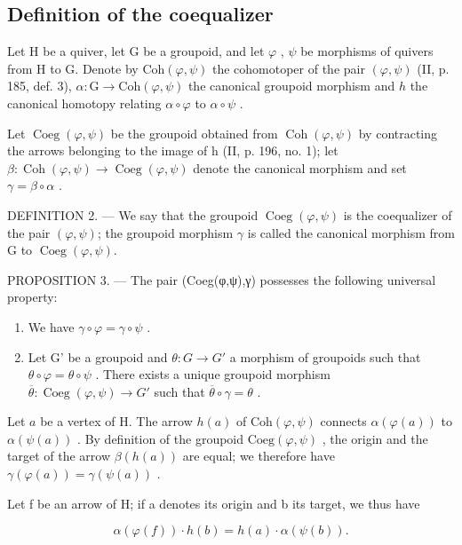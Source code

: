 \subsection{Definition of the coequalizer}

Let H be a quiver, let G be a groupoid, and let \(\varphi\) , \(\psi\) be morphisms of quivers from H to G. Denote by \(\mathrm{Coh}(\varphi,\psi)\) the cohomotoper of the pair \((\varphi,\psi)\) (II, p. 185, def. 3), \(\alpha\colon\mathrm{G}\to\mathrm{Coh}(\varphi,\psi)\) the canonical groupoid morphism and \(h\) the canonical homotopy relating \(\alpha\circ\varphi\) to \(\alpha\circ\psi\) .

Let \(\operatorname{Coeg}(\varphi,\psi)\) be the groupoid obtained from \(\operatorname{Coh}(\varphi,\psi)\) by contracting the arrows belonging to the image of h (II, p. 196, no. 1); let \(\beta\colon\operatorname{Coh}(\varphi,\psi)\to\operatorname{Coeg}(\varphi,\psi)\) denote the canonical morphism and set \(\gamma=\beta\circ\alpha\) .

DEFINITION 2. --- We say that the groupoid \(\operatorname{Coeg}(\varphi,\psi)\) is the coequalizer of the pair \((\varphi,\psi)\); the groupoid morphism \(\gamma\) is called the canonical morphism from G to \(\operatorname{Coeg}(\varphi,\psi)\).

PROPOSITION 3. --- The pair (Coeg(φ,ψ),γ) possesses the following universal property:

\begin{enumerate}
\def\labelenumi{\alph{enumi})}
\item
  We have \(\gamma \circ \varphi = \gamma \circ \psi\) .
\item
  Let G' be a groupoid and \(\theta\colon G\to G'\) a morphism of groupoids such that \(\theta\circ\varphi=\theta\circ\psi\) . There exists a unique groupoid morphism \(\overline{\theta}\colon\operatorname{Coeg}(\varphi,\psi)\to G'\) such that \(\overline{\theta}\circ\gamma=\theta\) .
\end{enumerate}

Let \(a\) be a vertex of H. The arrow \(h(a)\) of \(\mathrm{Coh}(\varphi, \psi)\) connects \(\alpha(\varphi(a))\) to \(\alpha(\psi(a))\) . By definition of the groupoid \(\mathrm{Coeg}(\varphi, \psi)\) , the origin and the target of the arrow \(\beta(h(a))\) are equal; we therefore have \(\gamma(\varphi(a)) = \gamma(\psi(a))\) .

Let f be an arrow of H; if a denotes its origin and b its target, we thus have

\[
\alpha (\varphi (f)) \cdot h (b) = h (a) \cdot \alpha (\psi (b)).
\]

